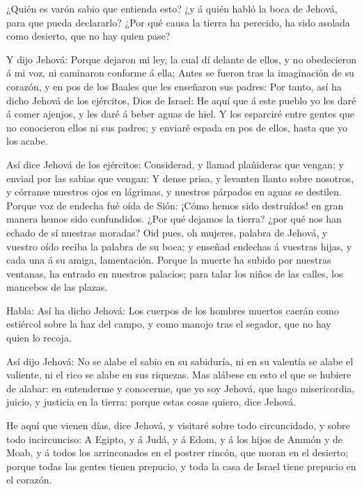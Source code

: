  ¿Quién es varón sabio que entienda esto? ¿y á quién habló
la boca de Jehová, para que pueda declararlo? ¿Por qué causa la tierra
ha perecido, ha sido asolada como desierto, que no hay quien pase?

 Y dijo Jehová: Porque dejaron mi ley, la cual dí delante
de ellos, y no obedecieron á mi voz, ni caminaron conforme á ella;
 Antes se fueron tras la imaginación de su corazón, y en
pos de los Baales que les enseñaron sus padres:  Por tanto,
así ha dicho Jehová de los ejércitos, Dios de Israel: He aquí que á este
pueblo yo les daré á comer ajenjos, y les daré á beber aguas de hiel.
 Y los esparciré entre gentes que no conocieron ellos ni
sus padres; y enviaré espada en pos de ellos, hasta que yo los acabe.

 Así dice Jehová de los ejércitos: Considerad, y llamad
plañideras que vengan; y enviad por las sabias que vengan: 
Y dense prisa, y levanten llanto sobre nosotros, y córranse nuestros
ojos en lágrimas, y nuestros párpados en aguas se destilen.
 Porque voz de endecha fué oída de Sión: ¡Cómo hemos sido
destruídos! en gran manera hemos sido confundidos. ¿Por qué dejamos la
tierra? ¿por qué nos han echado de sí nuestras moradas? 
Oid pues, oh mujeres, palabra de Jehová, y vuestro oído reciba la
palabra de su boca; y enseñad endechas á vuestras hijas, y cada una á su
amiga, lamentación.  Porque la muerte ha subido por
nuestras ventanas, ha entrado en nuestros palacios; para talar los niños
de las calles, los mancebos de las plazas.

 Habla: Así ha dicho Jehová: Los cuerpos de los hombres
muertos caerán como estiércol sobre la haz del campo, y como manojo tras
el segador, que no hay quien lo recoja.

 Así dijo Jehová: No se alabe el sabio en su sabiduría, ni
en su valentía se alabe el valiente, ni el rico se alabe en sus
riquezas.  Mas alábese en esto el que se hubiere de alabar:
en entenderme y conocerme, que yo soy Jehová, que hago misericordia,
juicio, y justicia en la tierra: porque estas cosas quiero, dice Jehová.

 He aquí que vienen días, dice Jehová, y visitaré sobre
todo circuncidado, y sobre todo incircunciso:  A Egipto, y
á Judá, y á Edom, y á los hijos de Ammón y de Moab, y á todos los
arrinconados en el postrer rincón, que moran en el desierto; porque
todas las gentes tienen prepucio, y toda la casa de Israel tiene
prepucio en el corazón.

